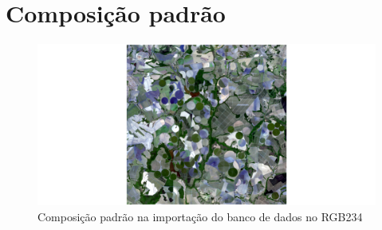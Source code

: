 \documentclass[a4paper]{article}
\begin{document}
	
	\section{Composição padrão}
	\begin{figure}[ht!]
		\hspace{-7.7cm}\includegraphics[width=1.9\linewidth]{../images/default}
		\caption{Composição padrão na importação do banco de dados no RGB234}
	\end{figure}
\end{document}
